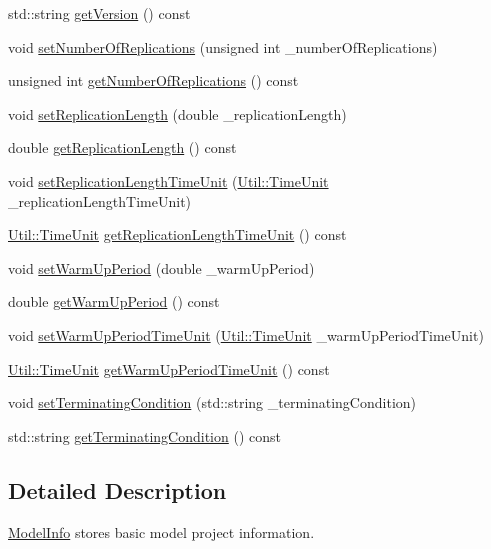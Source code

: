 \begin{DoxyCompactItemize}
std\+::string \hyperlink{class_model_info_a3edf40723a25ac5e48f687f61edfd831}{get\+Version} () const 
\item 
void \hyperlink{class_model_info_a72330fba06aa1ccff933b52ead028154}{set\+Number\+Of\+Replications} (unsigned int \+\_\+number\+Of\+Replications)
\item 
unsigned int \hyperlink{class_model_info_a66d8ae9376d62d74ea770d9e88e1bd89}{get\+Number\+Of\+Replications} () const 
\item 
void \hyperlink{class_model_info_a1566fe70905b1fe7fe1e092f139917bd}{set\+Replication\+Length} (double \+\_\+replication\+Length)
\item 
double \hyperlink{class_model_info_ab3d0f7e09c769b410618f99404b1eb4c}{get\+Replication\+Length} () const 
\item 
void \hyperlink{class_model_info_a9e0e1dd5f3fcee6d16c249451d0910ab}{set\+Replication\+Length\+Time\+Unit} (\hyperlink{class_util_a28504cc2fecc9aa47154cba4e625ec6f}{Util\+::\+Time\+Unit} \+\_\+replication\+Length\+Time\+Unit)
\item 
\hyperlink{class_util_a28504cc2fecc9aa47154cba4e625ec6f}{Util\+::\+Time\+Unit} \hyperlink{class_model_info_a4a6537a0fde41408839c7070f3d8f2b5}{get\+Replication\+Length\+Time\+Unit} () const 
\item 
void \hyperlink{class_model_info_ae3d5ebac01faed3db5e5e7fb54acc994}{set\+Warm\+Up\+Period} (double \+\_\+warm\+Up\+Period)
\item 
double \hyperlink{class_model_info_acdbb7b038db5c12d7b5e8e19674a778e}{get\+Warm\+Up\+Period} () const 
\item 
void \hyperlink{class_model_info_a24c120cce9ea134d6c9d1a2558866b30}{set\+Warm\+Up\+Period\+Time\+Unit} (\hyperlink{class_util_a28504cc2fecc9aa47154cba4e625ec6f}{Util\+::\+Time\+Unit} \+\_\+warm\+Up\+Period\+Time\+Unit)
\item 
\hyperlink{class_util_a28504cc2fecc9aa47154cba4e625ec6f}{Util\+::\+Time\+Unit} \hyperlink{class_model_info_adec436c79560bbfa5ec4e2bc21ae0450}{get\+Warm\+Up\+Period\+Time\+Unit} () const 
\item 
void \hyperlink{class_model_info_a4cb06dd9c3aeb8856ad50122714aa167}{set\+Terminating\+Condition} (std\+::string \+\_\+terminating\+Condition)
\item 
std\+::string \hyperlink{class_model_info_a31137229cc0de318e238bc9f18f021e2}{get\+Terminating\+Condition} () const 
\end{DoxyCompactItemize}


\subsection{Detailed Description}
\hyperlink{class_model_info}{Model\+Info} stores basic model project information. 

